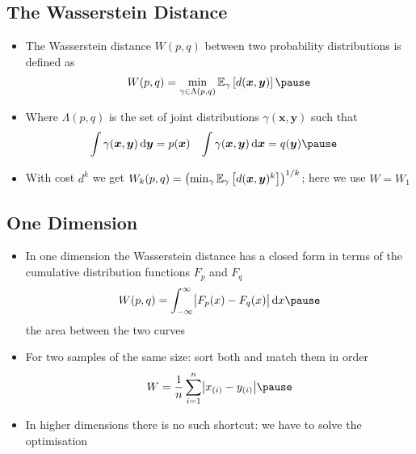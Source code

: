 \begin{slide}
\section{The Wasserstein Distance}

\begin{PauseHighLight}
  \begin{itemize}
  \item The Wasserstein distance $W(p,q)$ between two probability
    distributions is defined as
    \begin{align*}
      W(p,q) = \min_{\gamma \in \Lambda(p,q)}
      \av[\gamma]{d(\bm{x},\bm{y})}\pause
    \end{align*}
  \item Where $\Lambda(p,q)$ is the set of joint distributions
    $\gamma(\bm{x},\bm{y})$ such that
    \begin{align*}
      \int \gamma(\bm{x},\bm{y}) \, \dd \bm{y} &= p(\bm{x}) &
      \int \gamma(\bm{x},\bm{y}) \, \dd \bm{x} &= q(\bm{y})\pause
    \end{align*}
  \item With cost $d^k$ we get $W_k(p,q) = \bigl(\min_\gamma
    \av[\gamma]{d(\bm{x},\bm{y})^k}\bigr)^{1/k}$; here we use $W = W_1$\pause
  \end{itemize}
\end{PauseHighLight}

\end{slide}


\begin{slide}
\section[-2]{One Dimension}

\begin{PauseHighLight}
  \begin{itemize}
  \item In one dimension the Wasserstein distance has a closed form in
    terms of the cumulative distribution functions $F_p$ and $F_q$
    \begin{align*}
      W(p,q) = \int_{-\infty}^{\infty} \bigl|F_p(x) - F_q(x)\bigr|\,\dd x\pause
    \end{align*}
    the area between the two curves\pause
  \item For two samples of the same size: sort both and match them in
    order
    \begin{align*}
      W = \frac{1}{n}\sum_{i=1}^n \bigl|x_{(i)} - y_{(i)}\bigr|\pause
    \end{align*}
  \item In higher dimensions there is no such shortcut: we have to
    solve the optimisation\pause
  \end{itemize}
\end{PauseHighLight}

\end{slide}

